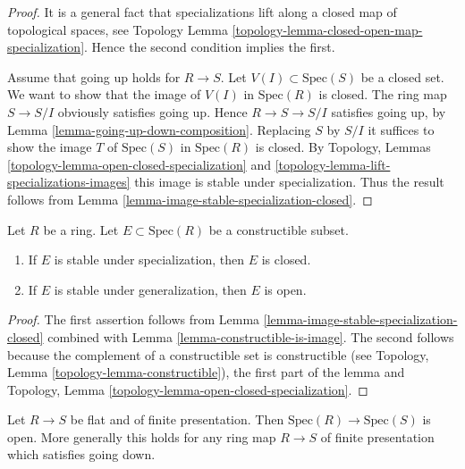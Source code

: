 \begin{proof}
It is a general fact that specializations lift along a
closed map of topological spaces, see Topology
Lemma \ref{topology-lemma-closed-open-map-specialization}.
Hence the second condition implies the first.

\medskip\noindent
Assume that going up holds for $R \to S$.
Let $V(I) \subset \text{Spec}(S)$ be a closed set.
We want to show that the image of $V(I)$ in $\text{Spec}(R)$ is closed.
The ring map $S \to S/I$ obviously satisfies going up.
Hence $R \to S \to S/I$ satisfies going up,
by Lemma \ref{lemma-going-up-down-composition}.
Replacing $S$ by $S/I$ it suffices to show the image $T$
of $\text{Spec}(S)$ in $\text{Spec}(R)$ is closed.
By Topology, Lemmas \ref{topology-lemma-open-closed-specialization}
and \ref{topology-lemma-lift-specializations-images} this
image is stable under specialization. Thus the result follows
from Lemma \ref{lemma-image-stable-specialization-closed}.
\end{proof}

\begin{lemma}
\label{lemma-constructible-stable-specialization-closed}
Let $R$ be a ring. Let $E \subset \text{Spec}(R)$ be a constructible subset.
\begin{enumerate}
\item If $E$ is stable under specialization, then $E$ is closed.
\item If $E$ is stable under generalization, then $E$ is open.
\end{enumerate}
\end{lemma}

\begin{proof}
The first assertion
follows from Lemma \ref{lemma-image-stable-specialization-closed}
combined with Lemma \ref{lemma-constructible-is-image}.
The second follows because the complement of a constructible
set is constructible
(see Topology, Lemma \ref{topology-lemma-constructible}),
the first part of the lemma and Topology,
Lemma \ref{topology-lemma-open-closed-specialization}.
\end{proof}

\begin{proposition}
\label{proposition-fppf-open}
Let $R \to S$ be flat and of finite presentation.
Then $\text{Spec}(R) \to \text{Spec}(S)$ is open.
More generally this holds for any ring map $R \to S$ of
finite presentation which satisfies going down.
\end{proposition}

